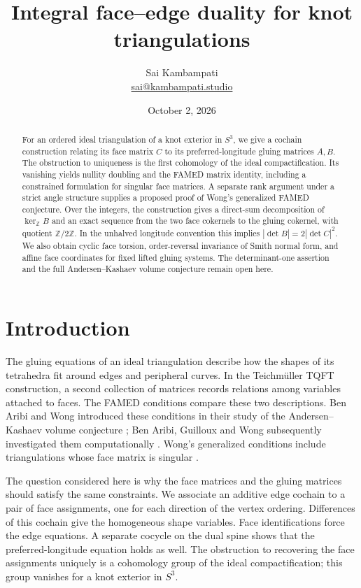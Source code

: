\documentclass[11pt]{article}
\title{Integral face--edge duality for knot triangulations}
\author{Sai Kambampati\\\small \href{mailto:sai@kambampati.studio}{sai@kambampati.studio}}
\date{October 2, 2026}
\theoremstyle{definition}\newtheorem{definition}[theorem]{Definition}
\theoremstyle{remark}\newtheorem{remark}[theorem]{Remark}
\newcommand{\Z}{\mathbb Z}
\begin{document}
\maketitle
\begin{abstract}
For an ordered ideal triangulation of a knot exterior in $S^3$, we give a cochain construction relating its face matrix $C$ to its preferred-longitude gluing matrices $A,B$. The obstruction to uniqueness is the first cohomology of the ideal compactification. Its vanishing yields nullity doubling and the FAMED matrix identity, including a constrained formulation for singular face matrices. A separate rank argument under a strict angle structure supplies a proposed proof of Wong's generalized FAMED conjecture. Over the integers, the construction gives a direct-sum decomposition of $\ker_{\Z}B$ and an exact sequence from the two face cokernels to the gluing cokernel, with quotient $\Z/2\Z$. In the unhalved longitude convention this implies $|\det B|=2|\det C|^2$. We also obtain cyclic face torsion, order-reversal invariance of Smith normal form, and affine face coordinates for fixed lifted gluing systems. The determinant-one assertion and the full Andersen--Kashaev volume conjecture remain open here.
\end{abstract}

\section{Introduction}
The gluing equations of an ideal triangulation describe how the shapes of its tetrahedra fit around edges and peripheral curves. In the Teichm\"uller TQFT construction, a second collection of matrices records relations among variables attached to faces. The FAMED conditions compare these two descriptions. Ben Aribi and Wong introduced these conditions in their study of the Andersen--Kashaev volume conjecture \cite{BW}; Ben Aribi, Guilloux and Wong subsequently investigated them computationally \cite{BGW}. Wong's generalized conditions include triangulations whose face matrix is singular \cite{Wong}.

The question considered here is why the face matrices and the gluing matrices should satisfy the same constraints. We associate an additive edge cochain to a pair of face assignments, one for each direction of the vertex ordering. Differences of this cochain give the homogeneous shape variables. Face identifications force the edge equations. A separate cocycle on the dual spine shows that the preferred-longitude equation holds as well. The obstruction to recovering the face assignments uniquely is a cohomology group of the ideal compactification; this group vanishes for a knot exterior in $S^3$.
\end{document}
